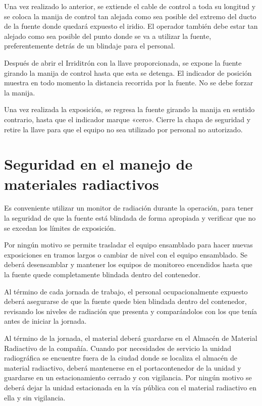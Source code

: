 Una vez realizado lo anterior, se extiende el cable de control a toda su longitud y se coloca la manija de control tan alejada como sea posible del extremo del ducto de la fuente donde quedará expuesto el iridio. El operador también debe estar tan alejado como sea posible del punto donde se va a utilizar la fuente, preferentemente detrás de un blindaje para el personal.

Después de abrir el Irriditrón con la llave proporcionada, se expone la fuente girando la manija de control hasta que esta se detenga. El indicador de posición muestra en todo momento la distancia recorrida por la fuente. No se debe forzar la manija.

Una vez realizada la exposición, se regresa la fuente girando la manija en sentido contrario, hasta que el indicador marque «cero». Cierre la chapa de seguridad y retire la llave para que el equipo no sea utilizado por personal no autorizado.

\section{Seguridad en el manejo de materiales radiactivos}

Es conveniente utilizar un monitor de radiación durante la operación, para tener la seguridad de que la fuente está blindada de forma apropiada y verificar que no se excedan los límites de exposición.

Por ningún motivo se permite trasladar el equipo ensamblado para hacer nuevas exposiciones en tramos largos o cambiar de nivel con el equipo ensamblado. Se deberá desensamblar y mantener los equipos de monitoreo encendidos hasta que la fuente quede completamente blindada dentro del contenedor.

Al término de cada jornada de trabajo, el personal ocupacionalmente expuesto deberá asegurarse de que la fuente quede bien blindada dentro del contenedor, revisando los niveles de radiación que presenta y comparándolos con los que tenía antes de iniciar la jornada.

Al término de la jornada, el material deberá guardarse en el Almacén de Material Radiactivo de la compañía. Cuando por necesidades de servicio la unidad radiográfica se encuentre fuera de la ciudad donde se localiza el almacén de material radiactivo, deberá mantenerse en el portacontenedor de la unidad y guardarse en un estacionamiento cerrado y con vigilancia. Por ningún motivo se deberá dejar la unidad estacionada en la vía pública con el material radiactivo en ella y sin vigilancia.

